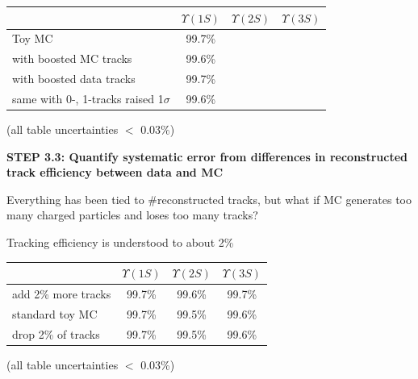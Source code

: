 \documentclass[landscape]{article}
\begin{document}
\begin{center}
  \renewcommand{\arraystretch}{1.25}
  \begin{tabular}{p{12 cm} c c c}
  & \mbox{\hspace{0.5 cm}} $\Upsilon(1S)$ \mbox{\hspace{0.5 cm}} & \mbox{\hspace{0.5 cm}} $\Upsilon(2S)$ \mbox{\hspace{0.5 cm}} & \mbox{\hspace{0.5 cm}} $\Upsilon(3S)$ \mbox{\hspace{0.5 cm}} \\\hline
  Toy MC & 99.7\% & & \\
  with boosted MC tracks & 99.6\% & & \\
  with boosted data tracks & 99.7\% & & \\
  same with 0-, 1-tracks raised 1$\sigma$ & 99.6\% & &
  \end{tabular}
\end{center}
\begin{flushright} (all table uncertainties $<$ 0.03\%) \end{flushright}

\vfill

\pagebreak

\vspace{1 cm}

{\bf STEP 3.3: Quantify systematic error from differences in
reconstructed track efficiency between data and MC}

\vfill

Everything has been tied to \#reconstructed tracks, but what if MC
generates too many charged particles and loses too many tracks?

\vfill

Tracking efficiency is understood to about 2\%

\vfill

\begin{center}
  \renewcommand{\arraystretch}{1.25}
  \begin{tabular}{p{12 cm} c c c}
  & \mbox{\hspace{0.5 cm}} $\Upsilon(1S)$ \mbox{\hspace{0.5 cm}} & \mbox{\hspace{0.5 cm}} $\Upsilon(2S)$ \mbox{\hspace{0.5 cm}} & \mbox{\hspace{0.5 cm}} $\Upsilon(3S)$ \mbox{\hspace{0.5 cm}} \\\hline
  add 2\% more tracks & 99.7\% & 99.6\% & 99.7\% \\
  standard toy MC & 99.7\% & 99.5\% & 99.6\% \\
  drop 2\% of tracks & 99.7\% & 99.5\% & 99.6\% \\
  \end{tabular}
\end{center}
\begin{flushright} (all table uncertainties $<$ 0.03\%) \end{flushright}
\end{document}
